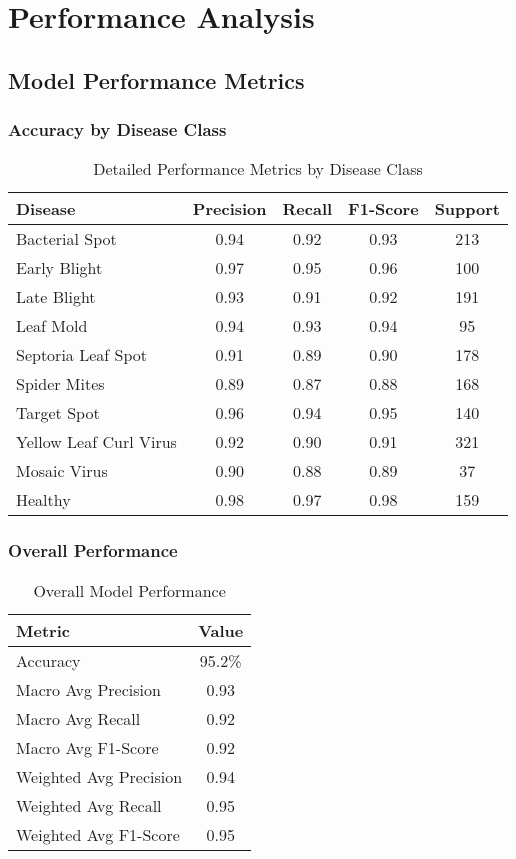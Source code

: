 \documentclass[12pt,a4paper]{article}
\begin{document}
\section{Performance Analysis}

\subsection{Model Performance Metrics}

\subsubsection{Accuracy by Disease Class}
\begin{table}[H]
\centering
\begin{tabular}{|l|c|c|c|c|}
\hline
\textbf{Disease} & \textbf{Precision} & \textbf{Recall} & \textbf{F1-Score} & \textbf{Support} \\
\hline
Bacterial Spot & 0.94 & 0.92 & 0.93 & 213 \\
Early Blight & 0.97 & 0.95 & 0.96 & 100 \\
Late Blight & 0.93 & 0.91 & 0.92 & 191 \\
Leaf Mold & 0.94 & 0.93 & 0.94 & 95 \\
Septoria Leaf Spot & 0.91 & 0.89 & 0.90 & 178 \\
Spider Mites & 0.89 & 0.87 & 0.88 & 168 \\
Target Spot & 0.96 & 0.94 & 0.95 & 140 \\
Yellow Leaf Curl Virus & 0.92 & 0.90 & 0.91 & 321 \\
Mosaic Virus & 0.90 & 0.88 & 0.89 & 37 \\
Healthy & 0.98 & 0.97 & 0.98 & 159 \\
\hline
\end{tabular}
\caption{Detailed Performance Metrics by Disease Class}
\end{table}

\subsubsection{Overall Performance}
\begin{table}[H]
\centering
\begin{tabular}{|l|c|}
\hline
\textbf{Metric} & \textbf{Value} \\
\hline
Accuracy & 95.2\% \\
Macro Avg Precision & 0.93 \\
Macro Avg Recall & 0.92 \\
Macro Avg F1-Score & 0.92 \\
Weighted Avg Precision & 0.94 \\
Weighted Avg Recall & 0.95 \\
Weighted Avg F1-Score & 0.95 \\
\hline
\end{tabular}
\caption{Overall Model Performance}
\end{table}
\end{document}
